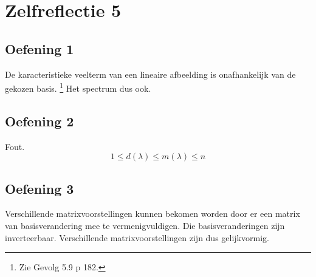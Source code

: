 \documentclass[lineaire_algebra_oplossingen.tex]{subfiles}
\begin{document}
\section{Zelfreflectie 5}
\subsection{Oefening 1}
De karacteristieke veelterm van een lineaire afbeelding is onafhankelijk van de gekozen basis. \footnote{Zie Gevolg 5.9 p 182.}
Het spectrum dus ook.

\subsection{Oefening 2}
Fout.
\[
1 \le d(\lambda) \le m(\lambda) \le n
\]

\subsection{Oefening 3}
Verschillende matrixvoorstellingen kunnen bekomen worden door er een matrix van basisverandering mee te vermenigvuldigen.
Die basisveranderingen zijn inverteerbaar. 
Verschillende matrixvoorstellingen zijn dus gelijkvormig.
\end{document}
